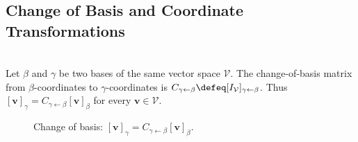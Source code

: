 \subsection{Change of Basis and Coordinate Transformations}
\begin{definition} \\
Let $\beta$ and $\gamma$ be two bases of the same vector space $\mathcal{V}$. The change-of-basis matrix from $\beta$-coordinates to $\gamma$-coordinates is $C_{\gamma \leftarrow \beta} \defeq [I_{\mathcal{V}}]_{\gamma \leftarrow \beta}$. Thus $[\mathbf{v}]_{\gamma} = C_{\gamma \leftarrow \beta}[\mathbf{v}]_{\beta}$ for every $\mathbf{v} \in \mathcal{V}$.
\end{definition}

\begin{figure}[H]
  \centering
  
  \caption{Change of basis: $[\mathbf{v}]_{\gamma}=C_{\gamma\leftarrow\beta}[\mathbf{v}]_{\beta}$.}
  \label{fig:change-of-basis-coordinate-triangle}
\end{figure}

